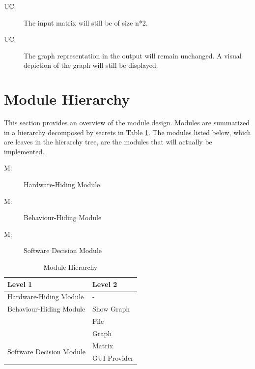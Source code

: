 \documentclass[12pt, titlepage]{article}
\newcounter{ucnum}
\newcommand{\uctheucnum}{UC\theucnum}
\newcounter{mnum}
\newcommand{\mthemnum}{M\themnum}
\begin{document}
\begin{description}
\item[ \uctheucnum \label{ucIO}:] The input matrix will still be of size n*2.
\item[ \uctheucnum \label{measure}:] The graph representation in the output will remain unchanged. A visual depiction of the graph will still be displayed.
\end{description}

\section{Module Hierarchy} \label{SecMH}

This section provides an overview of the module design. Modules are summarized
in a hierarchy decomposed by secrets in Table \ref{TblMH}. The modules listed
below, which are leaves in the hierarchy tree, are the modules that will
actually be implemented.

\begin{description}
\item [ \mthemnum \label{mHH}:] Hardware-Hiding Module
\item [ \mthemnum \label{mHH}:] Behaviour-Hiding Module
\item [ \mthemnum \label{mHH}:] Software Decision Module
\end{description}


\begin{table}[h!]
\centering
\begin{tabular}{p{} p{}}
\toprule
\textbf{Level 1} & \textbf{Level 2}\\
\midrule

{Hardware-Hiding Module} & - \\
\midrule

{Behaviour-Hiding Module} & Show Graph\\ & File\\ & Graph\\
\midrule

\multirow{3}{0.3\textwidth}{Software Decision Module} & Matrix\\ & GUI Provider\\
\bottomrule

\end{tabular}
\caption{Module Hierarchy}
\label{TblMH}
\end{table}
\end{document}
